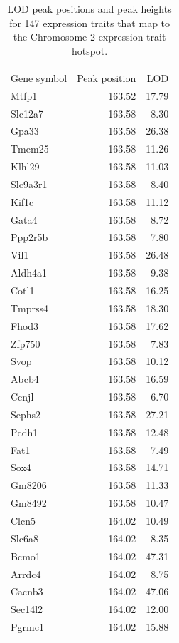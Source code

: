 \documentclass{article}
\begin{document}
\newpage
\begin{longtable}{lrr}
  \caption{LOD peak positions and peak heights for 147 expression traits that map to the Chromosome 2 expression trait hotspot.}
  \label{tab:hot-annot}
\hline \\

Gene symbol & Peak position & LOD \\ 
  \hline
Mtfp1 & 163.52 & 17.79 \\ 
  Slc12a7 & 163.58 & 8.30 \\ 
  Gpa33 & 163.58 & 26.38 \\ 
  Tmem25 & 163.58 & 11.26 \\ 
  Klhl29 & 163.58 & 11.03 \\ 
  Slc9a3r1 & 163.58 & 8.40 \\ 
  Kif1c & 163.58 & 11.12 \\ 
  Gata4 & 163.58 & 8.72 \\ 
  Ppp2r5b & 163.58 & 7.80 \\ 
  Vil1 & 163.58 & 26.48 \\ 
  Aldh4a1 & 163.58 & 9.38 \\ 
  Cotl1 & 163.58 & 16.25 \\ 
  Tmprss4 & 163.58 & 18.30 \\ 
  Fhod3 & 163.58 & 17.62 \\ 
  Zfp750 & 163.58 & 7.83 \\ 
  Svop & 163.58 & 10.12 \\ 
  Abcb4 & 163.58 & 16.59 \\ 
  Ccnjl & 163.58 & 6.70 \\ 
  Sephs2 & 163.58 & 27.21 \\ 
  Pcdh1 & 163.58 & 12.48 \\ 
  Fat1 & 163.58 & 7.49 \\ 
  Sox4 & 163.58 & 14.71 \\ 
  Gm8206 & 163.58 & 11.33 \\ 
  Gm8492 & 163.58 & 10.47 \\ 
  Clcn5 & 164.02 & 10.49 \\ 
  Slc6a8 & 164.02 & 8.35 \\ 
  Bcmo1 & 164.02 & 47.31 \\ 
  Arrdc4 & 164.02 & 8.75 \\ 
  Cacnb3 & 164.02 & 47.06 \\ 
  Sec14l2 & 164.02 & 12.00 \\ 
  Pgrmc1 & 164.02 & 15.88 \\ 

\end{longtable}
\end{document}
